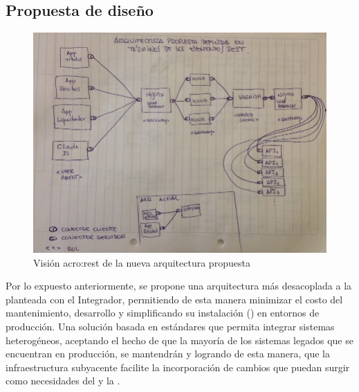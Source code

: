 \subsection{Propuesta de diseño}
\label{propuesta}


\begin{figure}
  \includegraphics[width=\linewidth]{src/images/04-capitulo-4/nueva-arq-segun-rest.jpg}
  \caption{Visión \gls{acro:rest} de la nueva arquitectura propuesta}
  \label{fig:ejemplo-rest-nueva-arquitectura}
\end{figure}



Por lo expuesto anteriormente, se propone una arquitectura más desacoplada a la planteada con el Integrador, permitiendo de esta manera minimizar el costo del mantenimiento, desarrollo y simplificando su instalación () en entornos de producción. Una solución basada en estándares que permita integrar sistemas heterogéneos, aceptando el hecho de que la mayoría de los sistemas legados que se encuentran en producción, se mantendrán y logrando de esta manera, que la infraestructura subyacente facilite la incorporación de cambios que puedan surgir como necesidades del \cespi y la \unlp.


